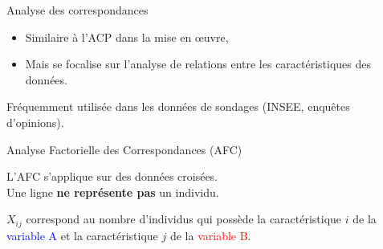 \begin{frame}{Analyse des correspondances}
  \begin{itemize}
    \item Similaire à l'ACP dans la mise en \oe uvre,
    \item Mais se focalise sur l'analyse de relations entre les caractéristiques des données.
  \end{itemize}

  Fréquemment utilisée dans les données de sondages (INSEE, enquêtes d'opinions).
\end{frame}

\begin{frame}{Analyse Factorielle des Correspondances (AFC)}
  \begin{center}
    L'AFC s'applique sur des données croisées.\\Une ligne \textbf{ne représente pas} un individu. 
  \end{center}
  
  \begin{minipage}{0.45\linewidth}
  \end{minipage}
  \hfill
  \begin{minipage}{0.49\linewidth}
    $X_{ij}$ correspond au nombre d'individus qui possède la caractéristique $i$ de la \textcolor{blue}{variable A} et la caractéristique $j$ de la \textcolor{red}{variable B}.
  \end{minipage}
\end{frame}

